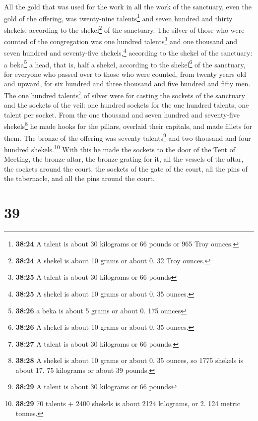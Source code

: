  All the gold that was used for the work in all the work
of the sanctuary, even the gold of the offering, was twenty-nine
talents\footnote{\textbf{38:24} A talent is about 30 kilograms or 66
  pounds or 965 Troy ounces.} and seven hundred and thirty shekels,
according to the shekel\footnote{\textbf{38:24} A shekel is about 10
  grams or about 0. 32 Troy ounces.} of the sanctuary. 
The silver of those who were counted of the congregation was one hundred
talents\footnote{\textbf{38:25} A talent is about 30 kilograms or 66
  pounds} and one thousand and seven hundred and seventy-five
shekels,\footnote{\textbf{38:25} A shekel is about 10 grams or about 0.
  35 ounces.} according to the shekel of the sanctuary: 
a beka\footnote{\textbf{38:26} a beka is about 5 grams or about 0. 175
  ounces} a head, that is, half a shekel, according to the
shekel\footnote{\textbf{38:26} A shekel is about 10 grams or about 0. 35
  ounces.} of the sanctuary, for everyone who passed over to those who
were counted, from twenty years old and upward, for six hundred and
three thousand and five hundred and fifty men.  The one
hundred talents\footnote{\textbf{38:27} A talent is about 30 kilograms
  or 66 pounds.} of silver were for casting the sockets of the sanctuary
and the sockets of the veil: one hundred sockets for the one hundred
talents, one talent per socket.  From the one thousand
and seven hundred and seventy-five shekels\footnote{\textbf{38:28} A
  shekel is about 10 grams or about 0. 35 ounces, so 1775 shekels is
  about 17. 75 kilograms or about 39 pounds.} he made hooks for the
pillars, overlaid their capitals, and made fillets for them.
 The bronze of the offering was seventy
talents\footnote{\textbf{38:29} A talent is about 30 kilograms or 66
  pounds} and two thousand and four hundred shekels.\footnote{\textbf{38:29}
  70 talents + 2400 shekels is about 2124 kilograms, or 2. 124 metric
  tonnes.}  With this he made the sockets to the door of
the Tent of Meeting, the bronze altar, the bronze grating for it, all
the vessels of the altar,  the sockets around the court,
the sockets of the gate of the court, all the pins of the tabernacle,
and all the pins around the court.

\hypertarget{section-38}{%
\section{39}\label{section-38}}

